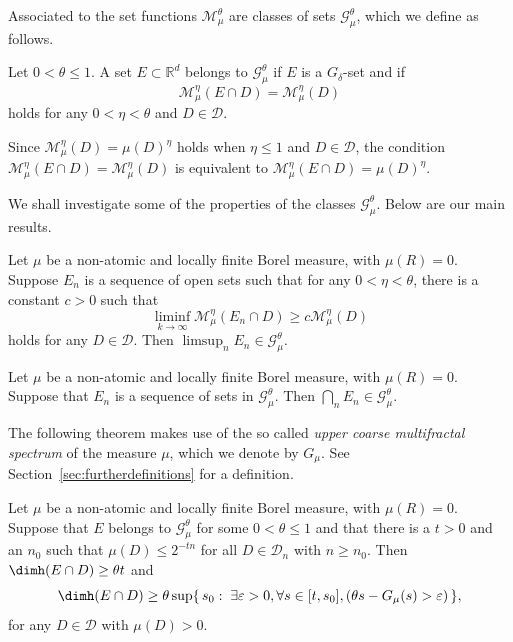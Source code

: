 Associated to the set functions $\mathscr{M}_\mu^\theta$ are classes of sets $\mathscr{G}_\mu^\theta$, which we define as follows.

\begin{defi}\label{def:class}
Let $0 < \theta \leq 1$. A set $E \subset \mathbb{R}^d$ belongs to $\mathscr{G}_\mu^\theta$ if $E$ is a $G_\delta$-set and if
\[
\mathscr{M}_\mu^\eta (E \cap D) = \mathscr{M}_\mu^\eta (D)
\]
holds for any $0 < \eta < \theta$ and $D \in \mathscr{D}$.
\end{defi}

\begin{rema}
Since $\mathscr{M}_\mu^\eta (D) = \mu (D)^\eta$ holds when $\eta
\leq 1$ and $D \in \mathscr{D}$, the condition $\mathscr{M}_\mu^\eta (E \cap D) = \mathscr{M}_\mu^\eta (D)$ is equivalent to $\mathscr{M}_\mu^\eta (E \cap D) = \mu (D)^\eta$.
\end{rema}

We shall investigate some of the properties of the classes $\mathscr{G}_\mu^\theta$. Below are our main results.

\begin{theo}\label{the:limsup}
Let $\mu$ be a non-atomic and locally finite Borel measure, with $\mu (R) = 0$. Suppose $E_n$ is a sequence of open sets such that for any $0 < \eta < \theta$, there is a constant $c > 0$ such that
\[
\liminf_{k\to\infty} \mathscr{M}_\mu^\eta (E_n \cap D) \geq c
\mathscr{M}_\mu^\eta (D)
\]
holds for any $D \in \mathscr{D}$. Then $\limsup_n E_n \in
\mathscr{G}_\mu^\theta$.
\end{theo}

\begin{theo}\label{the:intersection}
Let $\mu$ be a non-atomic and locally finite Borel measure, with $\mu (R) = 0$. Suppose that $E_n$ is a sequence of sets in $\mathscr{G}_\mu^\theta$. Then $\bigcap_n E_n \in
\mathscr{G}_\mu^\theta$.
\end{theo}

The following theorem makes use of the so called \emph{upper coarse multifractal spectrum} of the measure $\mu$, which we denote by $G_\mu$. See Section~\ref{sec:furtherdefinitions} for a definition.

\begin{theo}\label{the:dimension}
Let $\mu$ be a non-atomic and locally finite Borel measure, with $\mu (R) = 0$. Suppose that $E$ belongs to $\mathscr{G}_\mu^\theta$ for some $0 < \theta \leq 1$ and that there is a $t > 0$ and an $n_0$ such that $\mu (D) \leq 2^{-tn}$ for all $D \in \mathscr{D}_n$ with $n \geq n_0$. Then $\dimh (E \cap D) \geq \theta t$ and
\[
\dimh (E \cap D) \geq \theta \sup \{\, s_0 :\; \exists \varepsilon > 0, \forall s\in [t,s_0], (\theta s - G_\mu (s) > \varepsilon) \,\},
\]
for any $D \in \mathscr{D}$ with $\mu (D) > 0$.
\end{theo}

